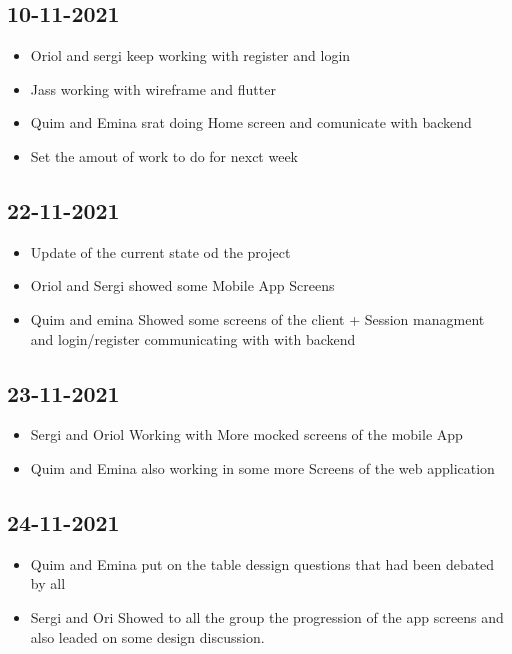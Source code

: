 \documentclass[./main.tex]{subfiles}
\begin{document}
\subsection{10-11-2021}
\begin{itemize}
\item Oriol and sergi keep working with register and login
\item Jass working with wireframe and flutter
\item Quim and Emina srat doing Home screen and comunicate with backend
\item Set the amout of work to do for nexct week
\end{itemize}

\subsection{22-11-2021}
\begin{itemize}
\item Update of the current state od the project
\item Oriol and Sergi showed some Mobile App Screens
\item Quim and emina Showed some screens of the client + Session managment and login/register communicating with with backend
\end{itemize}

\subsection{23-11-2021}
\begin{itemize}
\item Sergi and Oriol Working with More mocked screens of the mobile App
\item Quim and Emina also working in some more Screens of the web application
\end{itemize}

\subsection{24-11-2021}
\begin{itemize}
  \item Quim and Emina put on the table dessign questions that had been debated by all
  \item Sergi and Ori Showed to all the group the progression of the app screens and also leaded on some design discussion.
\end{itemize}
\end{document}
